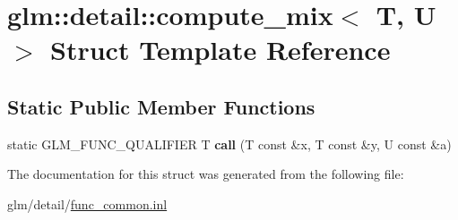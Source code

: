 \hypertarget{structglm_1_1detail_1_1compute__mix}{\section{glm\-:\-:detail\-:\-:compute\-\_\-mix$<$ T, U $>$ Struct Template Reference}
\label{structglm_1_1detail_1_1compute__mix}
}
\subsection*{Static Public Member Functions}
\begin{DoxyCompactItemize}
\item 
\hypertarget{structglm_1_1detail_1_1compute__mix_a13fd963d8385f36486509a48fd68da1c}{static G\-L\-M\-\_\-\-F\-U\-N\-C\-\_\-\-Q\-U\-A\-L\-I\-F\-I\-E\-R T {\bfseries call} (T const \&x, T const \&y, U const \&a)}\label{structglm_1_1detail_1_1compute__mix_a13fd963d8385f36486509a48fd68da1c}

\end{DoxyCompactItemize}


The documentation for this struct was generated from the following file\-:\begin{DoxyCompactItemize}
\item 
glm/detail/\hyperlink{func__common_8inl}{func\-\_\-common.\-inl}\end{DoxyCompactItemize}
